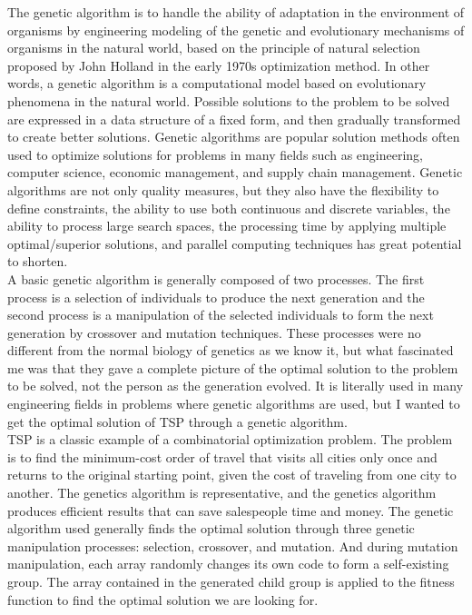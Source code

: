 \documentclass[12pt]{article}
\begin{document}
The genetic algorithm is to handle the ability of adaptation in the environment of organisms by engineering modeling of the genetic and evolutionary mechanisms of organisms in the natural world, based on the principle of natural selection proposed by John Holland in the early 1970s optimization method. In other words, a genetic algorithm is a computational model based on evolutionary phenomena in the natural world. Possible solutions to the problem to be solved are expressed in a data structure of a fixed form, and then gradually transformed to create better solutions. Genetic algorithms are popular solution methods often used to optimize solutions for problems in many fields such as engineering, computer science, economic management, and supply chain management. Genetic algorithms are not only quality measures, but they also have the flexibility to define constraints, the ability to use both continuous and discrete variables, the ability to process large search spaces, the processing time by applying multiple optimal/superior solutions, and parallel computing techniques has great potential to shorten\cite{dao2017bibliometric}.\\

A basic genetic algorithm is generally composed of two processes. The first process is a selection of individuals to produce the next generation and the second process is a manipulation of the selected individuals to form the next generation by crossover and mutation techniques\cite{razali2011genetic}. These processes were no different from the normal biology of genetics as we know it, but what fascinated me was that they gave a complete picture of the optimal solution to the problem to be solved, not the person as the generation evolved. It is literally used in many engineering fields in problems where genetic algorithms are used, but I wanted to get the optimal solution of TSP through a genetic algorithm.\\

TSP is a classic example of a combinatorial optimization problem. The problem is to find the minimum-cost order of travel that visits all cities only once and returns to the original starting point, given the cost of traveling from one city to another. The genetics algorithm is representative, and the genetics algorithm produces efficient results that can save salespeople time and money. The genetic algorithm used generally finds the optimal solution through three genetic manipulation processes: selection, crossover, and mutation. And during mutation manipulation, each array randomly changes its own code to form a self-existing group\cite{razali2011genetic}. The array contained in the generated child group is applied to the fitness function to find the optimal solution we are looking for.\\
\end{document}
